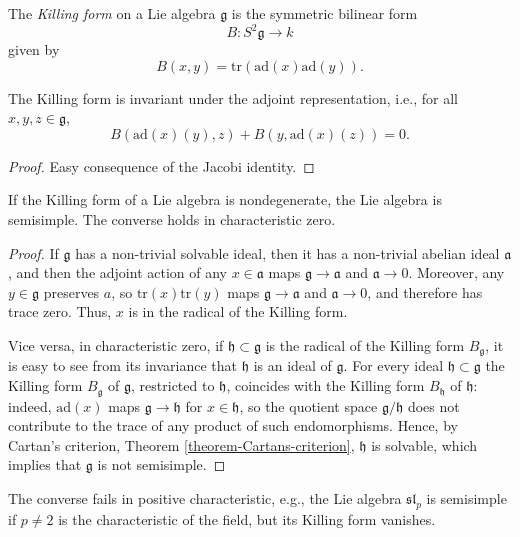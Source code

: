 \begin{definition}
\label{definition-Killing-form}
The {\it Killing form} on a Lie algebra $\mathfrak g$ is the symmetric bilinear form 
$$B:S^2 \mathfrak g\to k$$
given by 
$$ B(x,y) = \text{tr}(\text{ad}(x)\text{ad}(y)).$$
\end{definition}

\begin{lemma}
\label{lemma-Killing-invariant}
The Killing form is invariant under the adjoint representation, i.e., for all $x, y, z\in \mathfrak g$,
$$ B(\text{ad}(x)(y), z) + B(y, \text{ad}(x)(z)) = 0.$$
\end{lemma}

\begin{proof}
 Easy consequence of the Jacobi identity.
\end{proof}


\begin{theorem}
 \label{theorem-Killing-semisimplicity}
If the Killing form of a Lie algebra is nondegenerate, the Lie algebra is semisimple. The converse holds in characteristic zero.
\end{theorem}

\begin{proof}
 If $\mathfrak g$ has a non-trivial solvable ideal, then it has a non-trivial abelian ideal $\mathfrak a$, and then the adjoint action of any $x\in \mathfrak a$ maps $\mathfrak g\to\mathfrak a$ and $\mathfrak a\to 0$. Moreover, any $y\in \mathfrak g$ preserves $a$, so 
 $\text{tr}(x) \text{tr}(y)$ maps $\mathfrak g\to\mathfrak a$ and $\mathfrak a\to 0$, and therefore has trace zero. Thus, $x$ is in the radical of the Killing form.
 
 Vice versa, in characteristic zero, if $\mathfrak h\subset \mathfrak g$ is the radical of the Killing form $B_{\mathfrak g}$, it is easy to see from its invariance that $\mathfrak h$ is an ideal of $\mathfrak g$. For every ideal $\mathfrak h\subset \mathfrak g$ the Killing form $B_{\mathfrak g}$ of $\mathfrak g$, restricted to $\mathfrak h$, coincides with the Killing form $B_{\mathfrak h}$ of $\mathfrak h$: indeed, $\text{ad}(x)$ maps $\mathfrak g\to \mathfrak h$ for $x\in \mathfrak h$, so the quotient space $\mathfrak g/\mathfrak h$ does not contribute to the trace of any product of such endomorphisms. Hence, by Cartan's criterion, Theorem \ref{theorem-Cartans-criterion}, $\mathfrak h$ is solvable, which implies that $\mathfrak g$ is not semisimple.
\end{proof}

\begin{remark}
 \label{remark-Killing-positivechar}
 The converse fails in positive characteristic, e.g., the Lie algebra $\mathfrak{sl}_p$ is semisimple if $p\ne 2$ is the characteristic of the field, but its Killing form vanishes.
\end{remark}





